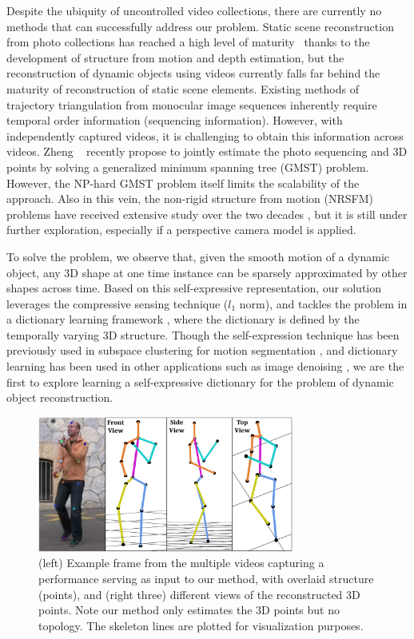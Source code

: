 Despite the ubiquity of uncontrolled video collections, there are currently no methods that can successfully address our problem.
Static scene reconstruction from photo collections has reached a high level of maturity~\cite{Snavely2,zheng2014patchmatch,Heinly} thanks to the development of structure from motion and depth estimation, but the reconstruction of dynamic objects using videos currently falls far behind the maturity of reconstruction of static scene elements. Existing methods of trajectory triangulation \cite{Park_ECCV2010, Valmadre_CVPR2012} from monocular image sequences inherently require temporal order information (sequencing information).
However, with independently captured videos, it is challenging to obtain this  information across videos. Zheng \etal~\cite{zheng2014joint} recently propose to jointly estimate the photo sequencing and 3D points by solving a generalized minimum spanning tree (GMST) problem. However, the NP-hard GMST problem itself limits the scalability of the approach. Also in this vein, the non-rigid structure from motion (NRSFM) problems have received extensive study over the two decades \cite{Tomasi_IJCV92,hartley2008perspective,dai2014simple}, but it is still under further exploration, especially if a perspective camera model is applied. 

To solve the problem, we observe that,
given the smooth motion of a dynamic object, any 3D shape at one time instance can be sparsely approximated by other shapes across time. 
Based on this self-expressive representation, our solution leverages the compressive sensing technique ($l_1$ norm), and tackles the problem in a dictionary learning framework \cite{aharon2006img,elad2006image}, where the dictionary is defined by the temporally varying 3D structure. Though the self-expression technique has been previously used in subspace clustering for motion segmentation \cite{elhamifar2009sparse}, and dictionary learning has been used in other applications such as image denoising \cite{elad2006image}, we are the first to explore learning a self-expressive dictionary for the problem of dynamic object reconstruction. 

\begin{figure}
\centering
\includegraphics[width=0.75\textwidth]{chapter5/resource/first_image_cropped.pdf}
\caption{\label{fig:first_image}(left) Example frame from the multiple videos capturing a performance serving as input to our method, with overlaid structure (points), and (right three) different views of the reconstructed 3D points. Note our method only estimates the 3D points but no topology. The skeleton lines are plotted  for visualization purposes.}
\end{figure} 

